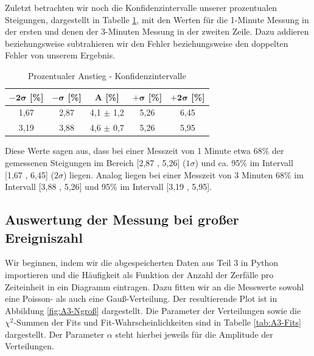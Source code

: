 \documentclass{article}
\begin{document}
\phantom{.}


Zuletzt betrachten wir noch die Konfidenzintervalle unserer prozentualen Steigungen, dargestellt in Tabelle \ref{tab:A1-Konfidenzintervalle}, mit den Werten für die 1-Minute Messung in der ersten und denen der 3-Minuten Messung in der zweiten Zeile. Dazu addieren beziehungsweise subtrahieren wir den Fehler beziehungsweise den doppelten Fehler von unserem Ergebnis.

\phantom{.}

\begin{table}[!h]
    \centering
    \begin{tabular}{ccccc}
        \hline
        $\bm{-2\sigma}$ [\%] & $\bm{-\sigma}$ [\%] & $\bm{A}$ [\%] & $\bm{+\sigma}$ [\%] & $\bm{+2\sigma}$ [\%]  \\ \hline
        1,67 & 2,87 & 4,1 $\pm$ 1,2 & 5,26 & 6,45  \\
        3,19 & 3,88 & 4,6 $\pm$ 0,7 & 5,26 & 5,95 \\ \hline
    \end{tabular}%
    \caption{Prozentualer Anstieg - Konfidenzintervalle}
    \label{tab:A1-Konfidenzintervalle}
\end{table}

\phantom{.}

Diese Werte sagen aus, dass bei einer Messzeit von 1 Minute etwa 68\% der gemessenen Steigungen im Bereich [2,87 , 5,26] ($1\sigma$) und ca. 95\% im Intervall [1,67 , 6,45] ($2\sigma$) liegen. Analog liegen bei einer Messzeit von 3 Minuten 68\% im Intervall [3,88 , 5,26] und 95\% im Intervall [3,19 , 5,95]. 



\newpage
\subsection{Auswertung der Messung bei großer Ereigniszahl}

Wir beginnen, indem wir die abgespeicherten Daten aus Teil 3 in Python importieren und die Häufigkeit als Funktion der Anzahl der Zerfälle pro Zeiteinheit in ein Diagramm eintragen. Dazu fitten wir an die Messwerte sowohl eine Poisson- als auch eine Gauß-Verteilung. Der resultierende Plot ist in Abbildung \ref{fig:A3-Ngroß} dargestellt. Die Parameter der Verteilungen sowie die $\chi^2$-Summen der Fits und Fit-Wahrscheinlichkeiten sind in Tabelle \ref{tab:A3-Fits} dargestellt. Der Parameter $\alpha$ steht hierbei jeweils für die Amplitude der Verteilungen.
\end{document}
